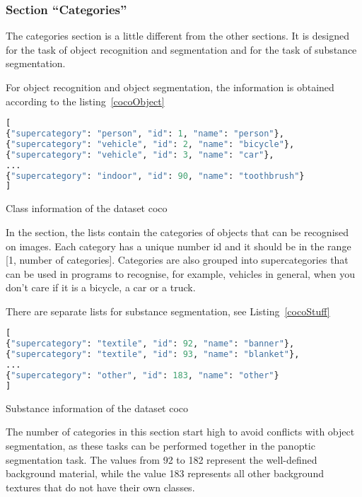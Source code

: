 \subsubsection{Section ``Categories''}

The categories section is a little different from the other sections. It is designed for the task of object recognition and segmentation and for the task of substance segmentation.

For object recognition and object segmentation, the information is obtained according to the listing~\ref{cocoObject}

\begin{code}
    \begin{lstlisting}[language=python]
[
{"supercategory": "person", "id": 1, "name": "person"},
{"supercategory": "vehicle", "id": 2, "name": "bicycle"},
{"supercategory": "vehicle", "id": 3, "name": "car"},
...
{"supercategory": "indoor", "id": 90, "name": "toothbrush"}
]
\end{lstlisting}

\caption{Class information of the dataset \ac{coco}}\label{cocoObject}
\end{code}

In the section, the lists contain the categories of objects that can be recognised on images. Each category has a unique number id and it should be in the range [1, number of categories]. Categories are also grouped into supercategories that can be used in programs to recognise, for example, vehicles in general, when you don't care if it is a bicycle, a car or a truck.

\bigskip

There are separate lists for substance segmentation, see Listing~\ref{cocoStuff}

\begin{code}
\begin{lstlisting}[language=python]
[
{"supercategory": "textile", "id": 92, "name": "banner"},
{"supercategory": "textile", "id": 93, "name": "blanket"},
...
{"supercategory": "other", "id": 183, "name": "other"}
]
\end{lstlisting}
\caption{Substance information of the dataset \ac{coco}}\label{cocoStuff}
\end{code}

The number of categories in this section start high to avoid conflicts with object segmentation, as these tasks can be performed together in the panoptic segmentation task. The values from 92 to 182 represent the well-defined background material, while the value 183 represents all other background textures that do not have their own classes.

